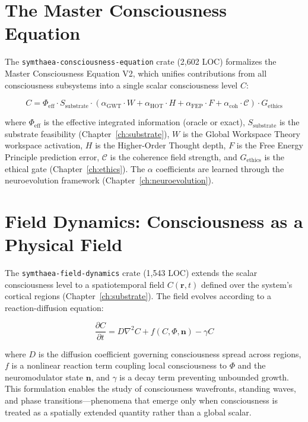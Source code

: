 \documentclass[12pt]{book}
\begin{document}
\section{The Master Consciousness Equation}

The \texttt{symthaea-consciousness-equation} crate (2,602 LOC) formalizes the Master Consciousness Equation V2, which unifies contributions from all consciousness subsystems into a single scalar consciousness level $C$:

\begin{equation}
\label{eq:master-consciousness}
C = \Phi_{\text{eff}} \cdot S_{\text{substrate}} \cdot \left(\alpha_{\text{GWT}} \cdot W + \alpha_{\text{HOT}} \cdot H + \alpha_{\text{FEP}} \cdot F + \alpha_{\text{coh}} \cdot \mathcal{C}\right) \cdot G_{\text{ethics}}
\end{equation}

\noindent where $\Phi_{\text{eff}}$ is the effective integrated information (oracle or exact), $S_{\text{substrate}}$ is the substrate feasibility (Chapter~\ref{ch:substrate}), $W$ is the Global Workspace Theory workspace activation, $H$ is the Higher-Order Thought depth, $F$ is the Free Energy Principle prediction error, $\mathcal{C}$ is the coherence field strength, and $G_{\text{ethics}}$ is the ethical gate (Chapter~\ref{ch:ethics}). The $\alpha$ coefficients are learned through the neuroevolution framework (Chapter~\ref{ch:neuroevolution}).

\section{Field Dynamics: Consciousness as a Physical Field}

The \texttt{symthaea-field-dynamics} crate (1,543 LOC) extends the scalar consciousness level to a spatiotemporal field $C(\mathbf{r}, t)$ defined over the system's cortical regions (Chapter~\ref{ch:substrate}). The field evolves according to a reaction-diffusion equation:

\begin{equation}
\frac{\partial C}{\partial t} = D \nabla^2 C + f(C, \Phi, \mathbf{n}) - \gamma C
\end{equation}

\noindent where $D$ is the diffusion coefficient governing consciousness spread across regions, $f$ is a nonlinear reaction term coupling local consciousness to $\Phi$ and the neuromodulator state $\mathbf{n}$, and $\gamma$ is a decay term preventing unbounded growth. This formulation enables the study of consciousness wavefronts, standing waves, and phase transitions---phenomena that emerge only when consciousness is treated as a spatially extended quantity rather than a global scalar.
\end{document}
